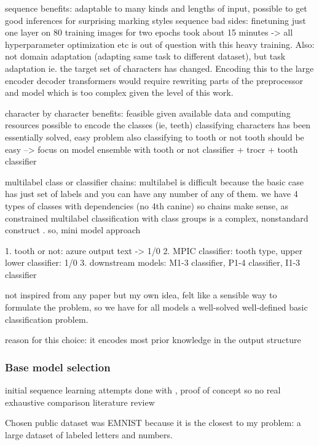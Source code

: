 \documentclass{article}
\begin{document}
sequence benefits: adaptable to many kinds and lengths of input, possible to get good inferences 
for surprising marking styles 
sequence bad sides: finetuning just one layer on 80 training images for two epochs took about 15 minutes
-> all hyperparameter optimization etc is out of question with this heavy training.
Also: not domain adaptation (adapting same task to different dataset), but task adaptation ie. 
the target set of characters has changed. Encoding this to the large encoder decoder transformers would 
require rewriting parts of the preprocessor and model which is too complex given the level of this work.

character by character benefits: feasible given available data and computing resources
possible to encode the classes (ie, teeth)
classifying characters has been essentially solved, easy problem 
also classifying to tooth or not tooth should be easy 
--> focus on model ensemble with tooth or not classifier + trocr + tooth classifier

multilabel class or classifier chains:
multilabel is difficult because the basic case has just set of labels and you can 
have any number of any of them. we have 4 types of classes with dependencies (no 4th canine)
so chains make sense, as constrained multilabel classification with class groups is a 
complex, nonstandard construct \cite{multilabel_classification}. so, mini model approach 

1. tooth or not: azure output text -> 1/0
2. MPIC classifier: tooth type, upper lower classifier: 1/0
3. downstream models: M1-3 classifier, P1-4 classifier, I1-3 classifier

not inspired from any paper but my own idea, felt like a sensible way to formulate the problem, 
so we have for all models a well-solved well-defined basic classification problem.

reason for this choice: it encodes most prior knowledge in the output structure

\subsubsection{Base model selection}

initial sequence learning attempts done with \cite{li2021trocr}, proof of concept so no real exhaustive comparison literature review

Chosen public dataset was EMNIST \cite{emnist} because it is the closest to my problem: a large dataset of labeled letters and numbers.
\end{document}
